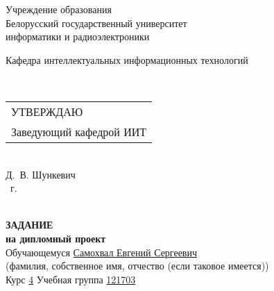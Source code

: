 {
  \thispagestyle{empty}
  \setlength{\parindent}{0em}

  \newcommand{\lineunderscore}{\uline{\hspace*{\fill}}}

  \begin{center}
    Учреждение образования\\
    Белорусский государственный университет\\
    информатики и радиоэлектроники\\[0.5em]
  

  \begin{minipage}{\textwidth}
      Кафедра интеллектуальных информационных технологий
  \end{minipage}\\[2em]

  \begin{minipage}{\textwidth}
    \begin{flushright}
      \begin{tabular}{@{}l@{}}
        УТВЕРЖДАЮ\\[0.5em]
        Заведующий кафедрой ИИТ
      \end{tabular}\\[0.7em]
      \underline{\hspace*{5.3em}} Д.~В. Шункевич\\ [0.5em]
      \underline{\hspace*{1.9em}} \underline{\hspace*{7.8em}} \the\year{}~г.
    \end{flushright}
  \end{minipage}\\[2em]

  \textbf{ЗАДАНИЕ} \\
  \textbf{на дипломный проект}\\[1em]

  Обучающемуся \uline{\hspace*{2em}}\uline{Самохвал Евгений Сергеевич}\lineunderscore \\
  {\footnotesize\hspace{9em}(фамилия, собственное имя, отчество (если таковое имеется))}\\
  
  Курс \uline{4\hspace*{2em}} Учебная группа \uline{121703}\lineunderscore\\[0.5em]
  

\end{center}}
